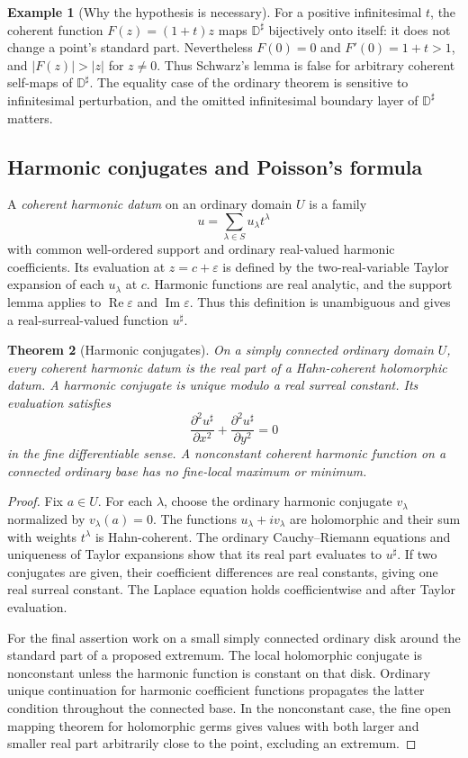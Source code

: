 \documentclass[11pt,letterpaper]{article}
\newtheorem{theorem}{Theorem}[section]
\theoremstyle{definition}
\newtheorem{example}[theorem]{Example}
\theoremstyle{remark}
\newcommand{\DD}{\mathbb D}
\newcommand{\im}{\operatorname{Im}}
\newcommand{\re}{\operatorname{Re}}
\newcommand{\sh}{^{\sharp}}
\numberwithin{equation}{section}
\begin{document}
\begin{example}[Why the hypothesis is necessary]\label{ex:Schwarzfailure}
For a positive infinitesimal $t$, the coherent function $F(z)=(1+t)z$ maps $\DD\sh$ bijectively onto itself: it does not change a point's standard part. Nevertheless $F(0)=0$ and $F'(0)=1+t>1$, and $|F(z)|>|z|$ for $z\ne0$. Thus Schwarz's lemma is false for arbitrary coherent self-maps of $\DD\sh$. The equality case of the ordinary theorem is sensitive to infinitesimal perturbation, and the omitted infinitesimal boundary layer of $\DD\sh$ matters.
\end{example}

\subsection{Harmonic conjugates and Poisson's formula}
A \emph{coherent harmonic datum} on an ordinary domain $U$ is a family
\[
 u=\sum_{\lambda\in S}u_\lambda t^\lambda
\]
with common well-ordered support and ordinary real-valued harmonic coefficients. Its evaluation at $z=c+\varepsilon$ is defined by the two-real-variable Taylor expansion of each $u_\lambda$ at $c$. Harmonic functions are real analytic, and the support lemma applies to $\re\varepsilon$ and $\im\varepsilon$. Thus this definition is unambiguous and gives a real-surreal-valued function $u\sh$.

\begin{theorem}[Harmonic conjugates]\label{thm:harmonic}
On a simply connected ordinary domain $U$, every coherent harmonic datum is the real part of a Hahn-coherent holomorphic datum. A harmonic conjugate is unique modulo a real surreal constant. Its evaluation satisfies
\[
 \frac{\partial^2u\sh}{\partial x^2}
 +\frac{\partial^2u\sh}{\partial y^2}=0
\]
in the fine differentiable sense. A nonconstant coherent harmonic function on a connected ordinary base has no fine-local maximum or minimum.
\end{theorem}
\begin{proof}
Fix $a\in U$. For each $\lambda$, choose the ordinary harmonic conjugate $v_\lambda$ normalized by $v_\lambda(a)=0$. The functions $u_\lambda+iv_\lambda$ are holomorphic and their sum with weights $t^\lambda$ is Hahn-coherent. The ordinary Cauchy--Riemann equations and uniqueness of Taylor expansions show that its real part evaluates to $u\sh$. If two conjugates are given, their coefficient differences are real constants, giving one real surreal constant. The Laplace equation holds coefficientwise and after Taylor evaluation.

For the final assertion work on a small simply connected ordinary disk around the standard part of a proposed extremum. The local holomorphic conjugate is nonconstant unless the harmonic function is constant on that disk. Ordinary unique continuation for harmonic coefficient functions propagates the latter condition throughout the connected base. In the nonconstant case, the fine open mapping theorem for holomorphic germs gives values with both larger and smaller real part arbitrarily close to the point, excluding an extremum.
\end{proof}
\end{document}
